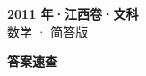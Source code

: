 \documentclass[zihao=-4, a4paper]{ctexart}
\begin{document}
\begin{center}
  {\Large\bfseries 2011 年·江西卷·文科}\\[4pt]
  {\large 数学 · 简答版}
\end{center}
\medskip
{}

\clearpage
{}
\begin{center}{\Large\bfseries 答案速查}\end{center}
\medskip

\end{document}
